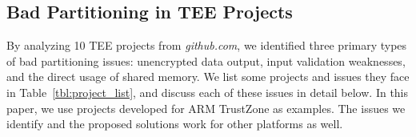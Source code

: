 \subsection{Bad Partitioning in TEE Projects} \label{s:bp}
By analyzing 10 TEE projects from \textit{github.com}, we identified three primary types of bad partitioning issues:  unencrypted data output,  input validation weaknesses, and  the direct usage of shared memory. We list some projects and issues they face in Table~\ref{tbl:project_list}, and discuss each of these issues in detail below.
In this paper, we use projects developed for ARM TrustZone as examples. The issues we identify and the proposed solutions work for other platforms as well.


